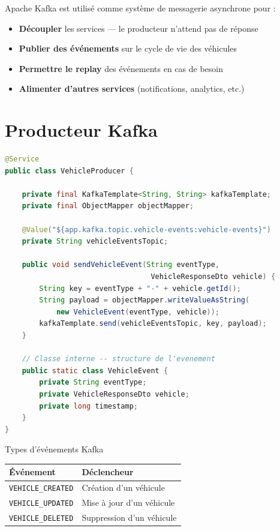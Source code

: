 \documentclass[12pt,a4paper]{report}
\begin{document}
Apache Kafka est utilis\'e comme syst\`eme de messagerie asynchrone pour :
\begin{itemize}
    \item \textbf{D\'ecoupler} les services --- le producteur n'attend pas de r\'eponse
    \item \textbf{Publier des \'ev\'enements} sur le cycle de vie des v\'ehicules
    \item \textbf{Permettre le replay} des \'ev\'enements en cas de besoin
    \item \textbf{Alimenter d'autres services} (notifications, analytics, etc.)
\end{itemize}

\section{Producteur Kafka}

\begin{lstlisting}[style=javastyle, language=Java, caption={VehicleProducer.java}]
@Service
public class VehicleProducer {

    private final KafkaTemplate<String, String> kafkaTemplate;
    private final ObjectMapper objectMapper;

    @Value("${app.kafka.topic.vehicle-events:vehicle-events}")
    private String vehicleEventsTopic;

    public void sendVehicleEvent(String eventType,
                                  VehicleResponseDto vehicle) {
        String key = eventType + "-" + vehicle.getId();
        String payload = objectMapper.writeValueAsString(
            new VehicleEvent(eventType, vehicle));
        kafkaTemplate.send(vehicleEventsTopic, key, payload);
    }

    // Classe interne -- structure de l'evenement
    public static class VehicleEvent {
        private String eventType;
        private VehicleResponseDto vehicle;
        private long timestamp;
    }
}
\end{lstlisting}

\begin{adrbox}{Types d'\'ev\'enements Kafka}
\begin{tabular}{l l}
\toprule
\textbf{\'Ev\'enement} & \textbf{D\'eclencheur} \\
\midrule
\texttt{VEHICLE\_CREATED} & Cr\'eation d'un v\'ehicule \\
\texttt{VEHICLE\_UPDATED} & Mise \`a jour d'un v\'ehicule \\
\texttt{VEHICLE\_DELETED} & Suppression d'un v\'ehicule \\
\bottomrule
\end{tabular}
\end{adrbox}
\end{document}
